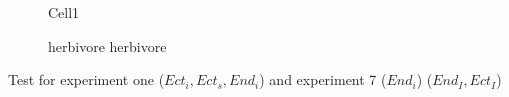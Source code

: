 



\begin{figure}
\centering

\caption{Cell1}
\label{fig:chap:res:dyn:cell1}
\end{figure}




\begin{figure}
\centering

\caption[Effect of carnivore group composition on herbivore biomass and abundance density]{herbivore herbivore}
\label{fig:chap:res:dyn:compherb}
\end{figure}


Test for experiment one ($Ect_i, Ect_s, End_i$) and experiment 7 ($End_i$) ($End_I, Ect_I$)

%
%